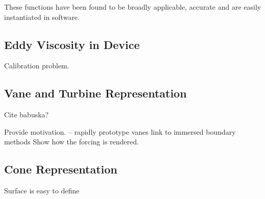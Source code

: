 These functions have been found to be broadly applicable, accurate and 
are easily instantiated in software. 

\subsection{Eddy Viscosity in Device}

Calibration problem. 

\subsection{Vane and Turbine Representation}

Cite babuska?

Provide motivation. -- rapidly prototype vanes
link to immersed boundary methods
Show how the forcing is rendered. 

\subsection{Cone Representation}

Surface is easy to define
